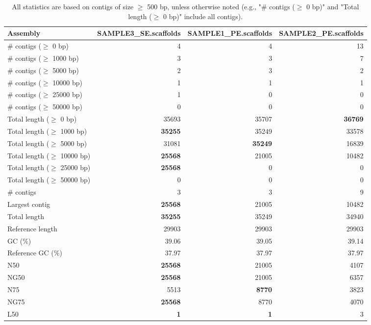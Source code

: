 \documentclass[12pt,a4paper]{article}
\begin{document}
\begin{table}[ht]
\begin{center}
\caption{All statistics are based on contigs of size $\geq$ 500 bp, unless otherwise noted (e.g., "\# contigs ($\geq$ 0 bp)" and "Total length ($\geq$ 0 bp)" include all contigs).}
\begin{tabular}{|l*{3}{|r}|}
\hline
Assembly & SAMPLE3\_SE.scaffolds & SAMPLE1\_PE.scaffolds & SAMPLE2\_PE.scaffolds \\ \hline
\# contigs ($\geq$ 0 bp) & 4 & 4 & 13 \\ \hline
\# contigs ($\geq$ 1000 bp) & 3 & 3 & 7 \\ \hline
\# contigs ($\geq$ 5000 bp) & 2 & 3 & 2 \\ \hline
\# contigs ($\geq$ 10000 bp) & 1 & 1 & 1 \\ \hline
\# contigs ($\geq$ 25000 bp) & 1 & 0 & 0 \\ \hline
\# contigs ($\geq$ 50000 bp) & 0 & 0 & 0 \\ \hline
Total length ($\geq$ 0 bp) & 35693 & 35707 & {\bf 36769} \\ \hline
Total length ($\geq$ 1000 bp) & {\bf 35255} & 35249 & 33578 \\ \hline
Total length ($\geq$ 5000 bp) & 31081 & {\bf 35249} & 16839 \\ \hline
Total length ($\geq$ 10000 bp) & {\bf 25568} & 21005 & 10482 \\ \hline
Total length ($\geq$ 25000 bp) & {\bf 25568} & 0 & 0 \\ \hline
Total length ($\geq$ 50000 bp) & 0 & 0 & 0 \\ \hline
\# contigs & 3 & 3 & 9 \\ \hline
Largest contig & {\bf 25568} & 21005 & 10482 \\ \hline
Total length & {\bf 35255} & 35249 & 34940 \\ \hline
Reference length & 29903 & 29903 & 29903 \\ \hline
GC (\%) & 39.06 & 39.05 & 39.14 \\ \hline
Reference GC (\%) & 37.97 & 37.97 & 37.97 \\ \hline
N50 & {\bf 25568} & 21005 & 4107 \\ \hline
NG50 & {\bf 25568} & 21005 & 6357 \\ \hline
N75 & 5513 & {\bf 8770} & 3823 \\ \hline
NG75 & {\bf 25568} & 8770 & 4070 \\ \hline
L50 & {\bf 1} & {\bf 1} & 3 \\ \hline

\end{tabular}
\end{center}
\end{table}
\end{document}
